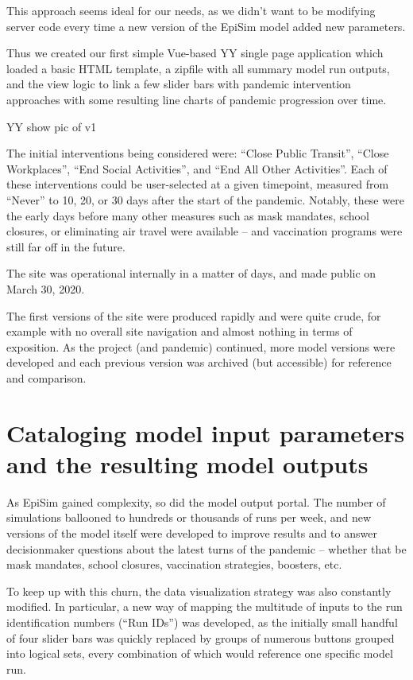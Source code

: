 This approach seems ideal for our needs, as we didn't want to be modifying server code every time a new version of the EpiSim model added new parameters.

Thus we created our first simple Vue-based YY single page application which loaded a basic HTML template, a zipfile with all summary model run outputs, and the view logic to link a few slider bars with pandemic intervention approaches with some resulting line charts of pandemic progression over time.

YY show pic of v1

The initial interventions being considered were: ``Close Public Transit'', ``Close Workplaces'', ``End Social Activities'', and ``End All Other Activities''. Each of these interventions could be user-selected at a given timepoint, measured from ``Never'' to 10, 20, or 30 days after the start of the pandemic. Notably, these were the early days before many other measures such as mask mandates, school closures, or eliminating air travel were available -- and vaccination programs were still far off in the future.

The site was operational internally in a matter of days, and made public on March 30, 2020.

The first versions of the site were produced rapidly and were quite crude, for example with no overall site navigation and almost nothing in terms of exposition. As the project (and pandemic) continued, more model versions were developed and each previous version was archived (but accessible) for reference and comparison.

\hypertarget{cataloging-model-input-parameters-and-the-resulting-model-outputs}{%
\section{Cataloging model input parameters and the resulting model outputs}\label{cataloging-model-input-parameters-and-the-resulting-model-outputs}}

As EpiSim gained complexity, so did the model output portal. The number of simulations ballooned to hundreds or thousands of runs per week, and new versions of the model itself were developed to improve results and to answer decisionmaker questions about the latest turns of the pandemic -- whether that be mask mandates, school closures, vaccination strategies, boosters, etc.

To keep up with this churn, the data visualization strategy was also constantly modified. In particular, a new way of mapping the multitude of inputs to the run identification numbers (``Run IDs'') was developed, as the initially small handful of four slider bars was quickly replaced by groups of numerous buttons grouped into logical sets, every combination of which would reference one specific model run.

